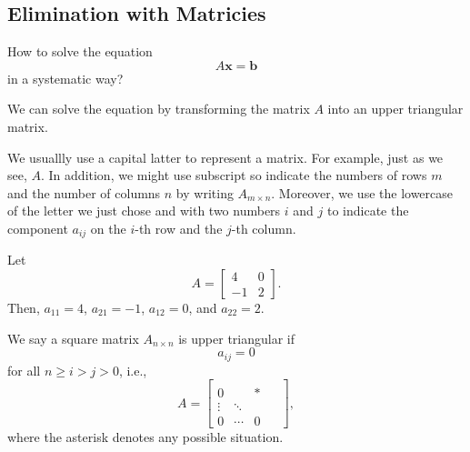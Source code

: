 \documentclass[11pt]{article}
\theoremstyle{break}
\theoremstyle{no_label}
\newcommand{\bfb}{\textbf{b}}
\newcommand{\bfx}{\textbf{x}}
\numberwithin{equation}{section}
\begin{document}
\subsection{Elimination with Matricies}

\begin{question}
    How to solve the equation \begin{equation*}
        A\bfx=\bfb
    \end{equation*}
    in a systematic way?
\end{question}

We can solve the equation by transforming the matrix $A$ into an upper triangular matrix.

\begin{notation}[Matrix]
    We usuallly use a capital latter to represent a matrix. For example, just as we see, $A$. In addition, we might use subscript so indicate the numbers of rows $m$ and the number of columns $n$ by writing $A_{m\times n}$. Moreover, we use the lowercase of the letter we just chose and with two numbers $i$ and $j$ to indicate the component $a_{ij}$ on the $i$-th row and the $j$-th column.
\end{notation}

\begin{example}
    Let $$A=\begin{bmatrix}
        4 & 0 \\ -1 & 2
    \end{bmatrix}.$$ Then, $a_{11}=4$, $a_{21}=-1$, $a_{12}=0$, and $a_{22}=2$.
\end{example}

\begin{definition}
    We say a square matrix $A_{n\times n}$ is upper triangular if
    \begin{equation*}
        a_{ij}=0
    \end{equation*}
    for all $n\ge i>j>0$, i.e., \begin{equation*}
        A=\begin{bmatrix}
            & & &\\
           0 & & \ast &\\
           \vdots  & \ddots &  \\
           0 & \cdots & 0 & \ \ 
        \end{bmatrix},
    \end{equation*}
    where the asterisk denotes any possible situation.
\end{definition}
\end{document}
